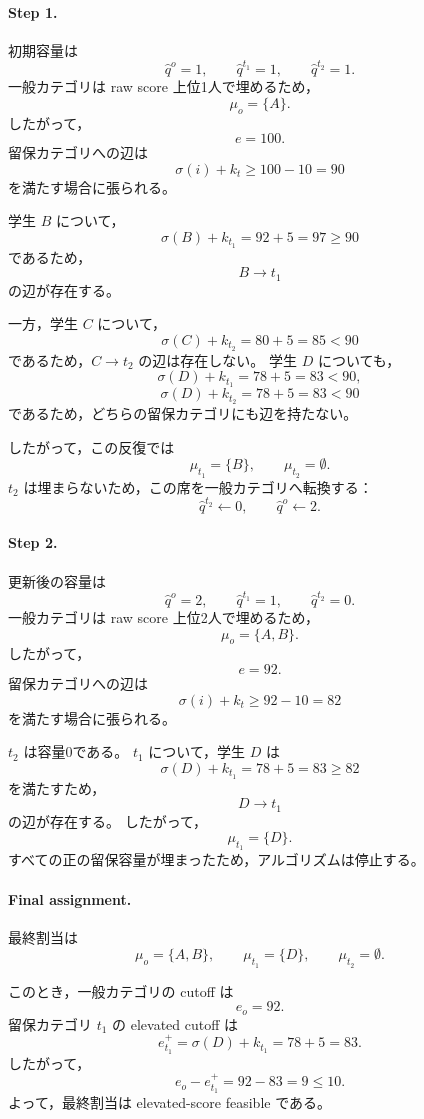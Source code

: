 \documentclass[
  12pt,
  a4paper,
  oneside,
  onecolumn,
  titlepage,
  final
]{jsarticle}
\newcommand{\1}{\mathbf{1}}
\begin{document}
\paragraph{Step 1.}
初期容量は
\[
    \hat q^o=1,
    \qquad
    \hat q^{t_1}=1,
    \qquad
    \hat q^{t_2}=1.
\]
一般カテゴリは raw score 上位1人で埋めるため，
\[
    \mu_o=\{A\}.
\]
したがって，
\[
    e=100.
\]
留保カテゴリへの辺は
\[
    \sigma(i)+k_t\ge 100-10=90
\]
を満たす場合に張られる。

学生 $B$ について，
\[
    \sigma(B)+k_{t_1}=92+5=97\ge 90
\]
であるため，
\[
    B\to t_1
\]
の辺が存在する。

一方，学生 $C$ について，
\[
    \sigma(C)+k_{t_2}=80+5=85<90
\]
であるため，$C\to t_2$ の辺は存在しない。
学生 $D$ についても，
\[
    \sigma(D)+k_{t_1}=78+5=83<90,
\]
\[
    \sigma(D)+k_{t_2}=78+5=83<90
\]
であるため，どちらの留保カテゴリにも辺を持たない。

したがって，この反復では
\[
    \mu_{t_1}=\{B\},
    \qquad
    \mu_{t_2}=\emptyset.
\]
$t_2$ は埋まらないため，この席を一般カテゴリへ転換する：
\[
    \hat q^{t_2}\gets 0,
    \qquad
    \hat q^o\gets 2.
\]

\paragraph{Step 2.}
更新後の容量は
\[
    \hat q^o=2,
    \qquad
    \hat q^{t_1}=1,
    \qquad
    \hat q^{t_2}=0.
\]
一般カテゴリは raw score 上位2人で埋めるため，
\[
    \mu_o=\{A,B\}.
\]
したがって，
\[
    e=92.
\]
留保カテゴリへの辺は
\[
    \sigma(i)+k_t\ge 92-10=82
\]
を満たす場合に張られる。

$t_2$ は容量0である。
$t_1$ について，学生 $D$ は
\[
    \sigma(D)+k_{t_1}=78+5=83\ge 82
\]
を満たすため，
\[
    D\to t_1
\]
の辺が存在する。
したがって，
\[
    \mu_{t_1}=\{D\}.
\]
すべての正の留保容量が埋まったため，アルゴリズムは停止する。

\paragraph{Final assignment.}
最終割当は
\[
    \mu_o=\{A,B\},
    \qquad
    \mu_{t_1}=\{D\},
    \qquad
    \mu_{t_2}=\emptyset.
\]

このとき，一般カテゴリの cutoff は
\[
    e_o=92.
\]
留保カテゴリ $t_1$ の elevated cutoff は
\[
    e_{t_1}^+=\sigma(D)+k_{t_1}=78+5=83.
\]
したがって，
\[
    e_o-e_{t_1}^+=92-83=9\le 10.
\]
よって，最終割当は elevated-score feasible である。
\end{document}
